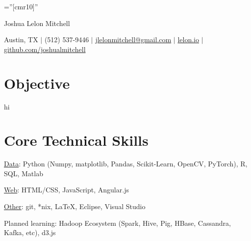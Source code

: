 \documentclass[a4paper,10pt]{article}
\begin{document}

\pagestyle{empty} %

\font\fb=''[cmr10]'' %

\par{\centering
		{\Huge Joshua Lelon Mitchell
	}\par}
\par{\centering
		{
	Austin, TX
	$\mid$
	(512) 537-9446
	$\mid$
	\href {mailto:jlelonmitchell@gmail.com}{jlelonmitchell@gmail.com}
	$\mid$
	\href {http://lelon.io/blog/2018/01/04/to-potential-employers}{lelon.io}
	$\mid$
	\href {https://github.com/joshualmitchell}{github.com/joshualmitchell}
}\par}

\section{Objective}
hi
\section{Core Technical Skills}

\underline{Data}: Python (Numpy, matplotlib, Pandas, Scikit-Learn, OpenCV, PyTorch), R, SQL, Matlab

\underline{Web}: HTML/CSS, JavaScript, Angular.js

\underline{Other}: git, *nix, LaTeX, Eclipse, Visual Studio

Planned learning: Hadoop Ecosystem (Spark, Hive, Pig, HBase, Cassandra, Kafka, etc), d3.js

\end{document}
